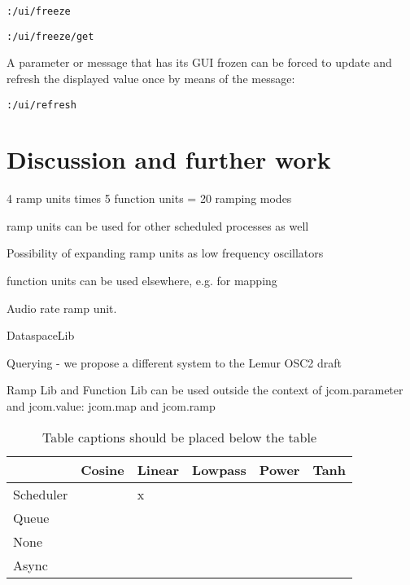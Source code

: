 \documentclass{article}
\begin{document}
\texttt{:/ui/freeze}

\texttt{:/ui/freeze/get}

A parameter or message that has its GUI frozen can be forced to update and refresh the displayed value once by means of the message:

\texttt{:/ui/refresh}





\section{Discussion and further work} %
\label{sec:discussion_and_further_work}

4 ramp units times 5 function units = 20 ramping modes

ramp units can be used for other scheduled processes as well

Possibility of expanding ramp units as low frequency oscillators

function units can be used elsewhere, e.g. for mapping

Audio rate ramp unit.

DataspaceLib

Querying - we propose a different system to the Lemur OSC2 draft

Ramp Lib and Function Lib can be used outside the context of jcom.parameter and jcom.value: jcom.map and jcom.ramp





\begin{table}
\begin{center}
\begin{tabular}{|l|l|l|l|l|l|}
\hline
          & Cosine & Linear & Lowpass & Power & Tanh \\
\hline
Scheduler &        &   x    &         &       & \\
\hline
Queue	  &        &        &         &       & \\
\hline
None	  &        &        &         &       & \\
\hline
Async	  &        &        &         &       & \\
\hline
\end{tabular}
\end{center}
\caption{Table captions should be placed below the table}
\label{tab:example}
\end{table}
\end{document}
